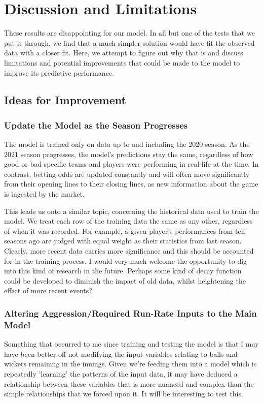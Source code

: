 \section{Discussion and Limitations}

These results are disappointing for our model. In all but one of the tests that we put it through, we find that a much simpler solution would have fit the observed data with a closer fit. Here, we attempt to figure out why that is and discuss limitations and potential improvements that could be made to the model to improve its predictive performance.

\subsection{Ideas for Improvement}

\subsubsection{Update the Model as the Season Progresses}

The model is trained only on data up to and including the 2020 season. As the 2021 season progresses, the model's predictions stay the same, regardless of how good or bad specific teams and players were performing in real-life at the time. In contrast, betting odds are updated constantly and will often move significantly from their opening lines to their closing lines, as new information about the game is ingested by the market.

This leads us onto a similar topic, concerning the historical data used to train the model. We treat each row of the training data the same as any other, regardless of when it was recorded. For example, a given player's performances from ten seasons ago are judged with equal weight as their statistics from last season. Clearly, more recent data carries more significance and this should be accounted for in the training process. I would very much welcome the opportunity to dig into this kind of research in the future. Perhaps some kind of decay function could be developed to diminish the impact of old data, whilst heightening the effect of more recent events?

\subsubsection{Altering Aggression/Required Run-Rate Inputs to the Main Model}

Something that occurred to me since training and testing the model is that I may have been better off not modifying the input variables relating to balls and wickets remaining in the innings. Given we're feeding them into a model which is repeatedly 'learning' the patterns of the input data, it may have deduced a relationship between these variables that is more nuanced and complex than the simple relationships that we forced upon it. It will be interesting to test this.

